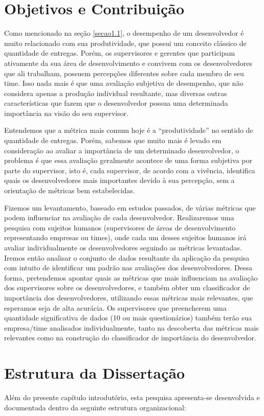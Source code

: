 \section{Objetivos e Contribuição}
Como mencionado na seção \ref{secao1.1}, o desempenho de um desenvolvedor é muito relacionado com sua produtividade, que possui um conceito clássico de quantidade de entregas. Porém, os supervisores e gerentes que participam ativamente da sua área de desenvolvimento e convivem com os desenvolvedores que ali trabalham, possuem percepções diferentes sobre cada membro de seu time. Isso nada mais é que uma avaliação subjetiva de desempenho, que não considera apenas a produção individual resultante, mas diversas outras características que fazem que o desenvolvedor possua uma determinada importância na visão do seu supervisor.

Entendemos que a métrica mais comum hoje é a “produtividade” no sentido de quantidade de entregas. Porém, sabemos que muito mais é levado em consideração ao avaliar a importância de um determinado desenvolvedor, o problema é que essa avaliação geralmente acontece de uma forma subjetiva por parte do supervisor, isto é, cada supervisor, de acordo com a vivência, identifica quais os desenvolvedores mais importantes devido à sua percepção, sem a orientação de métricas bem estabelecidas.

Fizemos um levantamento, baseado em estudos passados, de várias métricas que podem influenciar na avaliação de cada desenvolvedor. Realizaremos uma pesquisa com sujeitos humanos (supervisores de áreas de desenvolvimento representando empresas ou times), onde cada um desses sujeitos humanos irá avaliar individualmente os desenvolvedores seguindo as métricas levantadas. Iremos então analisar o conjunto de dados resultante da aplicação da pesquisa com intuito de identificar um padrão nas avaliações dos desenvolvedores. Dessa forma, pretendemos apontar quais as métricas que mais influenciam na avaliação dos supervisores sobre os desenvolvedores, e também obter um classificador de importância dos desenvolvedores, utilizando essas métricas mais relevantes, que esperamos seja de alta acurácia. Os supervisores que preencherem uma quantidade significativa de dados (10 ou mais questionários) também terão sua empresa/time analisados individualmente, tanto na descoberta das métricas mais relevantes como na construção do classificador de importância do desenvolvedor.


\section{Estrutura da Dissertação}
Além do presente capítulo introdutório, esta pesquisa apresenta-se desenvolvida e documentada dentro da seguinte estrutura organizacional:


